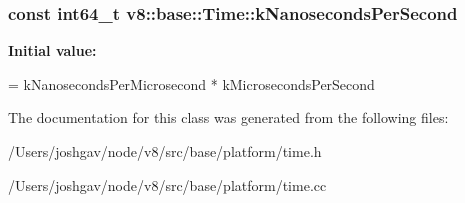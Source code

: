 \subsubsection[{\texorpdfstring{k\+Nanoseconds\+Per\+Second}{kNanosecondsPerSecond}}]{\setlength{\rightskip}{0pt plus 5cm}const int64\+\_\+t v8\+::base\+::\+Time\+::k\+Nanoseconds\+Per\+Second\hspace{0.3cm}{\ttfamily [static]}}\hypertarget{classv8_1_1base_1_1_time_ad4a411d002490bc0a3a068e72f9de13e}{}\label{classv8_1_1base_1_1_time_ad4a411d002490bc0a3a068e72f9de13e}
{\bfseries Initial value\+:}
\begin{DoxyCode}
= kNanosecondsPerMicrosecond *
                                               kMicrosecondsPerSecond
\end{DoxyCode}


The documentation for this class was generated from the following files\+:\begin{DoxyCompactItemize}
\item 
/\+Users/joshgav/node/v8/src/base/platform/time.\+h\item 
/\+Users/joshgav/node/v8/src/base/platform/time.\+cc\end{DoxyCompactItemize}
